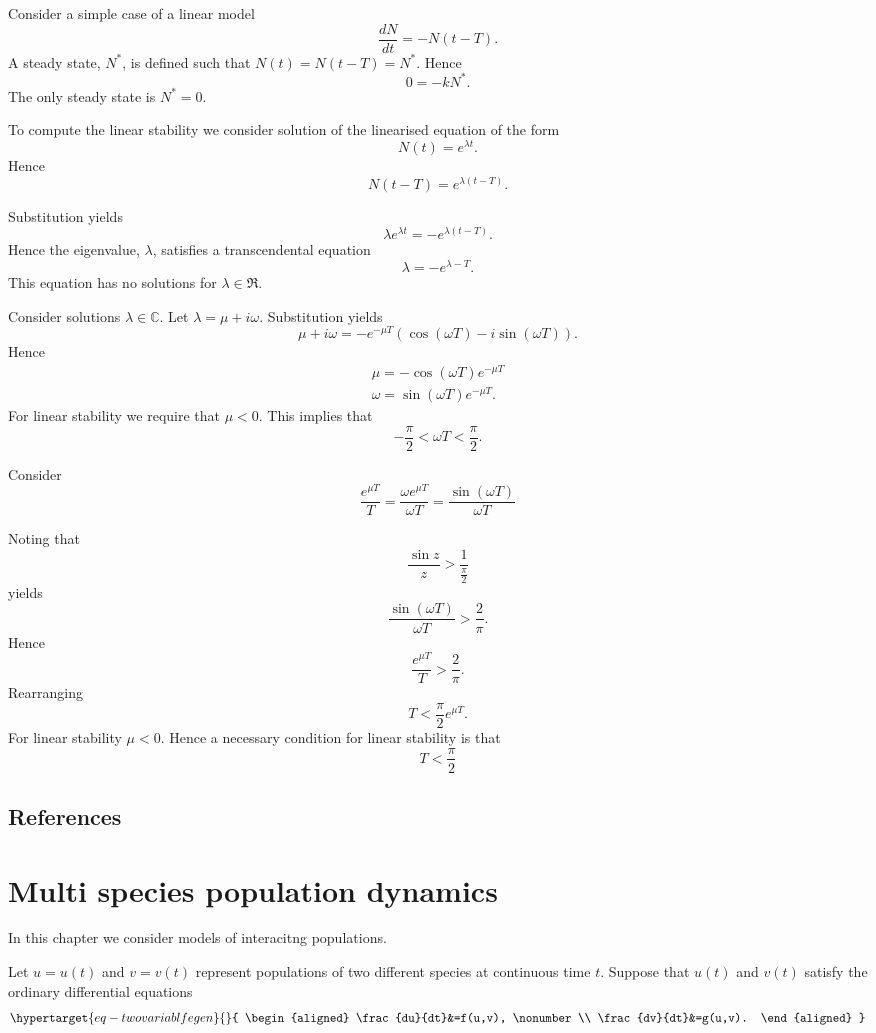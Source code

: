 \documentclass[
  letterpaper,
  DIV=11,
  numbers=noendperiod]{scrreprt}
\begin{document}
Consider a simple case of a linear model \[
\frac{dN}{dt}=-N(t-T).
\] A steady state, \(N^*\), is defined such that \(N(t)=N(t-T)=N^*\).
Hence \[
0=-kN^*.
\] The only steady state is \(N^*=0\).

To compute the linear stability we consider solution of the linearised
equation of the form \[
N(t)=e^{\lambda t}.
\] Hence \[
N(t-T)=e^{\lambda (t-T)}.
\]

Substitution yields \[
\lambda  e^{\lambda t} = - e^{\lambda (t-T)}.
\] Hence the eigenvalue, \(\lambda\), satisfies a transcendental
equation \[
\lambda=-e^{\lambda -T}.
\] This equation has no solutions for \(\lambda \in \Re\).

Consider solutions \(\lambda \in \mathbb{C}\). Let
\(\lambda=\mu+i\omega\). Substitution yields \[
\mu+i\omega = -e^{-\mu T}(\cos(\omega T)-i \sin(\omega T)).
\] Hence \[
\begin{aligned}
\mu=-\cos(\omega T)e^{-\mu T} \\
\omega = \sin(\omega T)e^{-\mu T}.
\end{aligned}
\] For linear stability we require that \(\mu <0\). This implies that \[
-\frac{\pi}{2}<\omega T < \frac{\pi}{2}.
\]

Consider \[
\frac{e^{\mu T}}{T}=\frac{\omega e^{\mu T}}{\omega T} = \frac{\sin(\omega T)}{\omega T}
\]

Noting that \[
\frac{\sin z}{z} > \frac{1}{\frac{\pi}{2}}
\] yields \[
 \frac{\sin(\omega T)}{\omega T}>\frac{2}{\pi}.
\] Hence \[
\frac{e^{\mu T}}{T} >\frac{2}{\pi}.
\] Rearranging \[
T<\frac{\pi}{2}e^{\mu T}.
\] For linear stability \(\mu<0\). Hence a necessary condition for
linear stability is that \[
T<\frac{\pi}{2}
\]

\hypertarget{references-1}{%
\section{References}\label{references-1}}

\hypertarget{multi-species-population-dynamics-1}{%
\chapter{Multi species population
dynamics}\label{multi-species-population-dynamics-1}}

In this chapter we consider models of interacitng populations.

Let \(u=u(t)\) and \(v=v(t)\) represent populations of two different
species at continuous time \(t\). Suppose that \(u(t)\) and \(v(t)\)
satisfy the ordinary differential equations
\begin{equation}\protect\hypertarget{eq-twovariablfegen}{}{
\begin{aligned}
\frac{du}{dt}&=f(u,v),  \nonumber \\
\frac{dv}{dt}&=g(u,v).
\end{aligned}
}\label{eq-twovariablfegen}\end{equation}
\end{document}
